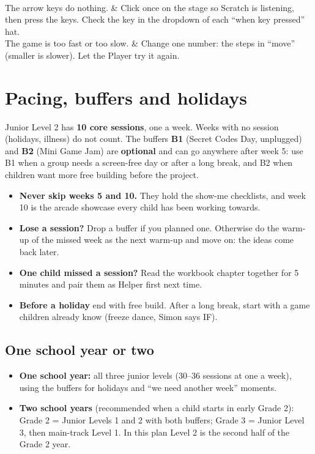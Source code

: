 \documentclass[track=junior,level=2,teacher]{kidscode}
\newenvironment{guidetable}[1]{\par\noindent\small\renewcommand{\arraystretch}{1.3}%
  \longtable{#1}}{\endlongtable\par}
\begin{document}
\begin{guidetable}{@{}>{\RaggedRight}p{5.4cm}>{\RaggedRight\arraybackslash}p{\dimexpr\linewidth-5.4cm-2\tabcolsep}@{}}
\midrule
{}\\ \midrule
The arrow keys do nothing. & Click once on the stage so Scratch is listening, then press the keys. Check the key in the dropdown of each \enquote{when key pressed} hat.\\
The game is too fast or too slow. & Change one number: the steps in \enquote{move} (smaller is slower). Let the Player try it again.\\
\end{guidetable}

\section{Pacing, buffers and holidays}
Junior Level 2 has \textbf{10 core sessions}, one a week. Weeks with no session (holidays, illness)
do not count. The buffers \textbf{B1} (Secret Codes Day, unplugged) and \textbf{B2} (Mini Game Jam)
are \textbf{optional} and can go anywhere after week 5: use B1 when a group needs a screen-free day or
after a long break, and B2 when children want more free building before the project.

\begin{tip}
\begin{itemize}[itemsep=2pt]
  \item \textbf{Never skip weeks 5 and 10.} They hold the show-me checklists, and week 10 is the
        arcade showcase every child has been working towards.
  \item \textbf{Lose a session?} Drop a buffer if you planned one. Otherwise do the warm-up of the
        missed week as the next warm-up and move on: the ideas come back later.
  \item \textbf{One child missed a session?} Read the workbook chapter together for 5 minutes and pair
        them as Helper first next time.
  \item \textbf{Before a holiday} end with free build. After a long break, start with a game children
        already know (freeze dance, Simon says IF).
\end{itemize}
\end{tip}

\subsection{One school year or two}
\begin{itemize}[itemsep=2pt]
  \item \textbf{One school year:} all three junior levels (30--36 sessions at one a week), using the
        buffers for holidays and \enquote{we need another week} moments.
  \item \textbf{Two school years} (recommended when a child starts in early Grade 2):
        Grade 2 = Junior Levels 1 and 2 with both buffers; Grade 3 = Junior Level 3, then main-track Level 1.
        In this plan Level 2 is the second half of the Grade 2 year.
\end{itemize}
\end{document}
